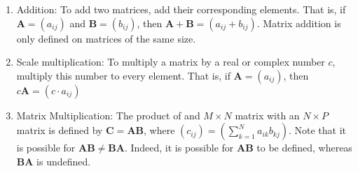 \documentclass[crop=false,class=book,oneside]{standalone}
\begin{document}
            \begin{enumerate}
                \item Addition: To add two matrices, add their
                    corresponding elements. That is, if
                    $\mathbf{A}=(a_{ij})$ and $\mathbf{B}=(b_{ij})$,
                    then $\mathbf{A}+\mathbf{B}=(a_{ij}+b_{ij})$.
                    Matrix addition is only defined on matrices of
                    the same size.
                \item Scale multiplication: To multiply a
                    matrix by a real or complex number $c$,
                    multiply this number to every element. That is,
                    if $\mathbf{A}=(a_{ij})$, then
                    $c\mathbf{A}=({c}\cdot{a_{ij}})$
                \item Matrix Multiplication: The product of
                    and ${M}\times{N}$ matrix with an
                    ${N}\times{P}$ matrix is defined by
                    $\mathbf{C}=\mathbf{A}\mathbf{B}$, where
                    $(c_{ij})=(\sum_{k=1}^{N}a_{ik}b_{kj})$. Note
                    that it is possible for
                    $\mathbf{A}\mathbf{B}\ne\mathbf{B}\mathbf{A}$.
                    Indeed, it is possible for
                    $\mathbf{A}\mathbf{B}$ to be defined, whereas
                    $\mathbf{B}\mathbf{A}$ is undefined.
            \end{enumerate}
\end{document}
